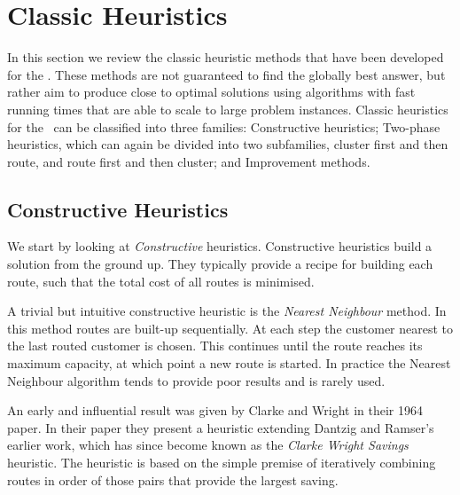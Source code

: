 \section{Classic Heuristics}
\label{sec:ch}

In this section we review the classic heuristic methods that have been developed for the \VRP. These methods are not guaranteed to find the globally best answer, but rather aim to produce close to optimal solutions using algorithms with fast running times that are able to scale to large problem instances. Classic heuristics for the \VRP\ can be classified into three families: Constructive heuristics; Two-phase heuristics, which can again be divided into two subfamilies, cluster first and then route, and route first and then cluster; and Improvement methods.

\subsection{Constructive Heuristics}
\label{subsec:conheu}

We start by looking at \emph{Constructive} heuristics. Constructive heuristics build a solution from the ground up. They typically provide a recipe for building each route, such that the total cost of all routes is minimised.

A trivial but intuitive constructive heuristic is the \emph{Nearest Neighbour} method. In this method routes are built-up sequentially. At each step the customer nearest to the last routed customer is chosen. This continues until the route reaches its maximum capacity, at which point a new route is started. In practice the Nearest Neighbour algorithm tends to provide poor results and is rarely used. 
 

An early and influential result was given by Clarke and Wright in their 1964 paper\cite{clark:1964}. In their paper they present a heuristic extending Dantzig and Ramser's earlier work, which has since become known as the \emph{Clarke Wright Savings} heuristic. The heuristic is based on the simple premise of iteratively combining routes in order of those pairs that provide the largest saving. 


